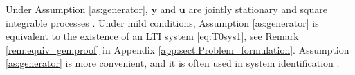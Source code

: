 \documentclass{article}
\def\rvu{{\mathbf{i}}}
\def\rvu{{\mathbf{u}}}
\def\rvy{{\mathbf{y}}}
\newtheorem{remark}[theorem]{Remark}
\newcommand{\e}{\mathbf{e}}
\newcommand{\y}{\mathbf{y}}
\newcommand{\bE}{\mathbf{E}}
\begin{document}
Under Assumption \ref{as:generator}, 
$\rvy$ and $\rvu$ are jointly stationary and square integrable processes
\cite{CainesBook}.
%
{\color{black}
   Under mild 
   conditions, Assumption \ref{as:generator} is equivalent to the existence of  an LTI system
   \eqref{eq:T0sys1}, see Remark \ref{rem:equiv_gen:proof} in Appendix \ref{app:sect:Problem_formulation}. 
   Assumption \ref{as:generator}
   is more convenient, and it is often
   used in system identification \cite[Chapter 9]{Katayama:05}.
}
\end{document}
